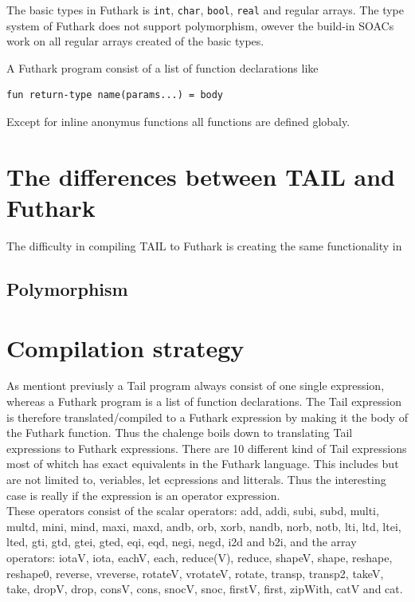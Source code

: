 \documentclass[11pt]{article}
\begin{document}
The basic types in Futhark is {\tt int}, {\tt char}, {\tt bool}, {\tt real} and regular arrays.
The type system of Futhark does not support polymorphism,
owever the build-in SOACs work on all regular arrays created of the basic types. 


A Futhark program consist of a list of function declarations like
\begin{lstlisting}[numbers=none,frame=none]
fun return-type name(params...) = body
\end{lstlisting}

Except for inline anonymus functions all functions are defined globaly. 

\section{The differences between TAIL and Futhark}
The difficulty in compiling TAIL to Futhark is creating the same functionality in 

\subsection{Polymorphism}

\section{Compilation strategy}
As mentiont previusly a Tail program always consist of one single expression, whereas a Futhark program is a list of function declarations. The Tail expression is therefore translated/compiled to a Futhark expression by making it the body of the Futhark function. 
Thus the chalenge boils down to translating Tail expressions to Futhark expressions. 
There are 10 different kind of Tail expressions most of whitch has exact equivalents in the Futhark language. This includes but are not limited to, veriables, let ecpressions and litterals. Thus the interesting case is really if the expression is an operator expression. \\

These operators consist of the scalar operators: add, addi, subi, subd, multi, multd, mini, mind, maxi, maxd, andb, orb, xorb, nandb, norb, notb, lti, ltd, ltei, lted, gti, gtd, gtei, gted, eqi, eqd, negi, negd, i2d and b2i, and the array operators: iotaV, iota, eachV, each, reduce(V), reduce, shapeV, shape, reshape, reshape0, reverse, vreverse, rotateV, vrotateV, rotate, transp, transp2, takeV, take, dropV, drop, consV, cons, snocV, snoc, firstV, first, zipWith, catV and cat. \\
\end{document}
